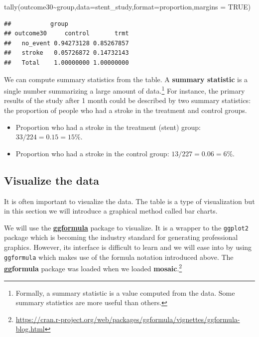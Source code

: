 \documentclass[
]{book}
\newenvironment{Shaded}{\begin{snugshade}}{\end{snugshade}}
\newcommand{\AttributeTok}[1]{\textcolor[rgb]{0.77,0.63,0.00}{#1}}
\newcommand{\ConstantTok}[1]{\textcolor[rgb]{0.00,0.00,0.00}{#1}}
\newcommand{\FunctionTok}[1]{\textcolor[rgb]{0.00,0.00,0.00}{#1}}
\newcommand{\NormalTok}[1]{#1}
\newcommand{\SpecialCharTok}[1]{\textcolor[rgb]{0.00,0.00,0.00}{#1}}
\newcommand{\StringTok}[1]{\textcolor[rgb]{0.31,0.60,0.02}{#1}}
\begin{document}
\begin{Shaded}
\begin{Highlighting}[]
\FunctionTok{tally}\NormalTok{(outcome30}\SpecialCharTok{\textasciitilde{}}\NormalTok{group,}\AttributeTok{data=}\NormalTok{stent\_study,}\AttributeTok{format=}\StringTok{\textquotesingle{}proportion\textquotesingle{}}\NormalTok{,}\AttributeTok{margins =} \ConstantTok{TRUE}\NormalTok{)}
\end{Highlighting}
\end{Shaded}

\begin{verbatim}
##           group
## outcome30     control       trmt
##   no_event 0.94273128 0.85267857
##   stroke   0.05726872 0.14732143
##   Total    1.00000000 1.00000000
\end{verbatim}

We can compute summary statistics from the table. A \textbf{summary statistic} is a single number summarizing a large amount of data.\footnote{Formally, a summary statistic is a value computed from the data. Some summary statistics are more useful than others.} For instance, the primary results of the study after 1 month could be described by two summary statistics: the proportion of people who had a stroke in the treatment and control groups.

\begin{itemize}
\item
  Proportion who had a stroke in the treatment (stent) group: \(33/224 = 0.15 = 15\%\).
\item
  Proportion who had a stroke in the control group: \(13/227 = 0.06 = 6\%\).
\end{itemize}

\hypertarget{visualize-the-data}{%
\subsection{Visualize the data}\label{visualize-the-data}}

It is often important to visualize the data. The table is a type of visualization but in this section we will introduce a graphical method called bar charts.

We will use the \href{https://cran.r-project.org/web/packages/ggformula/vignettes/ggformula-blog.html}{\textbf{ggformula}} package to visualize. It is a wrapper to the \texttt{ggplot2} package which is becoming the industry standard for generating professional graphics. However, its interface is difficult to learn and we will ease into by using \texttt{ggformula} which makes use of the formula notation introduced above. The \textbf{ggformula} package was loaded when we loaded \textbf{mosaic}.\footnote{\url{https://cran.r-project.org/web/packages/ggformula/vignettes/ggformula-blog.html}}
\end{document}
